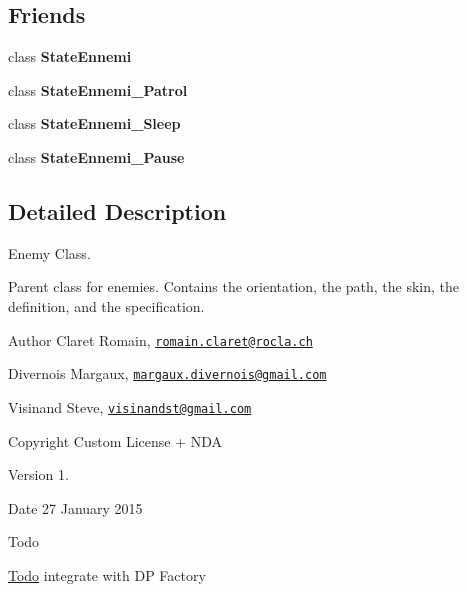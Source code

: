 \subsection*{Friends}
\begin{DoxyCompactItemize}
\item 
\hypertarget{class_ennemi_ad4e940eeddddccbb3f0fa1b9c6655b19}{}class {\bfseries State\+Ennemi}\label{class_ennemi_ad4e940eeddddccbb3f0fa1b9c6655b19}

\item 
\hypertarget{class_ennemi_a3993e6f153d417c1b39a3fd9887fd2fe}{}class {\bfseries State\+Ennemi\+\_\+\+Patrol}\label{class_ennemi_a3993e6f153d417c1b39a3fd9887fd2fe}

\item 
\hypertarget{class_ennemi_aabb95dc3768b5bcbfc4b8577fd2e8673}{}class {\bfseries State\+Ennemi\+\_\+\+Sleep}\label{class_ennemi_aabb95dc3768b5bcbfc4b8577fd2e8673}

\item 
\hypertarget{class_ennemi_a6a6b7120d88c0cd46c85c0af86341abf}{}class {\bfseries State\+Ennemi\+\_\+\+Pause}\label{class_ennemi_a6a6b7120d88c0cd46c85c0af86341abf}

\end{DoxyCompactItemize}


\subsection{Detailed Description}
Enemy Class. 

Parent class for enemies. Contains the orientation, the path, the skin, the definition, and the specification. \begin{DoxyAuthor}{Author}
Claret Romain, \href{mailto:romain.claret@rocla.ch}{\tt romain.\+claret@rocla.\+ch} 

Divernois Margaux, \href{mailto:margaux.divernois@gmail.com}{\tt margaux.\+divernois@gmail.\+com} 

Visinand Steve, \href{mailto:visinandst@gmail.com}{\tt visinandst@gmail.\+com} 
\end{DoxyAuthor}
\begin{DoxyCopyright}{Copyright}
Custom License + N\+D\+A 
\end{DoxyCopyright}
\begin{DoxyVersion}{Version}
1. 
\end{DoxyVersion}
\begin{DoxyDate}{Date}
27 January 2015 
\end{DoxyDate}
\begin{DoxyRefDesc}{Todo}
\item[\hyperlink{todo__todo000006}{Todo}]integrate with D\+P Factory \end{DoxyRefDesc}


